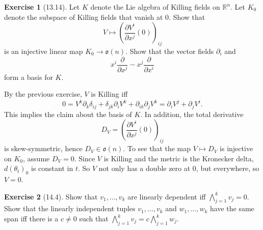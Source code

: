 \documentclass[10pt]{article}
\newcommand{\RR}{\mathbb{R}}
\theoremstyle{definition}
\newtheorem{exer}{Exercise}
\begin{document}
\begin{exer}[13.14]
Let $K$ denote the Lie algebra of Killing fields on $\RR^n$.
Let $K_0$ denote the subspace of Killing fields that vanish at $0$.
Show that
$$V \mapsto \left(\frac{\partial V^i}{\partial x^j}(0)\right)_{ij}$$
is an injective linear map $K_0 \to \mathfrak o(n)$.
Show that the vector fields $\partial_i$ and
$$x^i\frac{\partial}{\partial x^j} - x^j \frac{\partial}{\partial x^i}$$
form a basis for $K$.
\end{exer}

By the previous exercise, $V$ is Killing iff
$$0 = V^k \partial_k \delta_{ij} + \delta_{jk} \partial_i V^k + \partial_{ik} \partial_j V^k = \partial_i V^j + \partial_j V^i.$$
This implies the claim about the basis of $K$.
In addition, the total derivative
$$D_V = \left(\frac{\partial V^i}{\partial x^j}(0)\right)_{ij}$$
is skew-symmetric, hence $D_V \in \mathfrak o(n)$.
To see that the map $V \mapsto D_V$ is injective on $K_0$, assume $D_V = 0$.
Since $V$ is Killing and the metric is the Kronecker delta, $d(\theta_t)_0$ is constant in $t$.
So $V$ not only has a double zero at $0$, but everywhere, so $V = 0$.

\begin{exer}[14.4]
Show that $v_1, \dots, v_k$ are linearly dependent iff $\bigwedge_{j=1}^k v_j = 0$.
Show that the linearly independent tuples $v_1, \dots, v_k$ and $w_1, \dots, w_k$ have the same span iff there is a $c \neq 0$ such that $\bigwedge_{j=1}^k v_j = c\bigwedge_{j=1}^k w_j$.
\end{exer}
\end{document}

